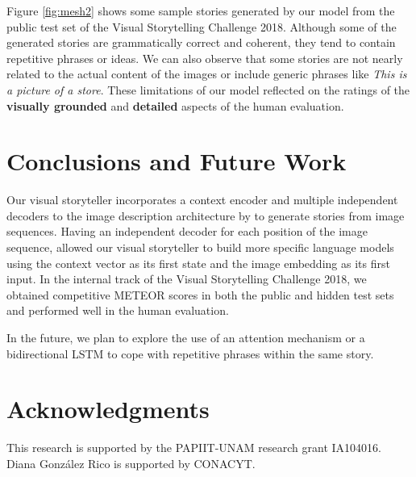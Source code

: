 \documentclass[11pt,a4paper]{article}
\begin{document}
Figure \ref{fig:mesh2} shows some sample stories generated by our model from the public test set of the Visual Storytelling Challenge 2018. Although some of the generated stories are grammatically correct and coherent, they tend to contain repetitive phrases or ideas. We can also observe that some stories are not nearly related to the actual content of the images or include generic phrases like \textit{This is a picture of a store}. These limitations of our model reflected on the ratings of the \textbf{visually grounded} and \textbf{detailed} aspects of the human evaluation.

\section{Conclusions and Future Work}
Our visual storyteller incorporates a context encoder and multiple independent decoders to the image description architecture by \cite{vinyals} to generate stories from image sequences. Having an independent decoder for each position of the image sequence, allowed our visual storyteller to build more specific language models using the context vector as its first state and the image embedding as its first input. In the internal track of the Visual Storytelling Challenge 2018, we obtained competitive METEOR scores in both the public and hidden test sets and performed well in the human evaluation. 

In the future, we plan to explore the use of an attention mechanism or a bidirectional LSTM to cope with repetitive phrases within the same story.

\section{Acknowledgments}
This research is supported by the PAPIIT-UNAM research grant IA104016. 
Diana Gonz\'alez Rico is supported by CONACYT.  



\end{document}
